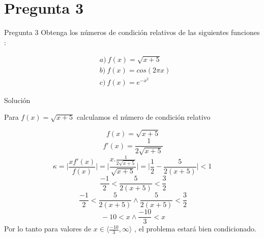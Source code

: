 \documentclass[10pts]{beamer}
\begin{document}
\vspace*{\fill}
\newpage



\section{Pregunta 3}
\begin{frame}{Pregunta 3}
     Obtenga los números de condición relativos de las siguientes funciones :

        \begin{equation}
        \begin{split}
	    &a) \ f(x)=\sqrt{x+5} \\
	    &b) \ f(x)=cos(2{\pi}x) \\
	    &c) \ f(x)=e^{-x^2} 
	    \end{split}
        \end{equation}
        
\end{frame}

\begin{frame}{Solución}

\vspace*{\fill}
Para $f(x) = \sqrt{x+5}$ calculamos el número de condición relativo 

    \[ \ f(x)=\sqrt{x+5}\]
    \[ \ f'(x)= \frac{1}{2\sqrt{x+5}} \]
    \[\kappa = \bigg | \frac{x f'(x)}{f(x)} \bigg|  = \bigg | \frac{x.\frac{1}{2\sqrt{x+5}}}{\sqrt{x+5}} \bigg| = \bigg|\frac{1}{2}-\frac{5}{2(x+5)}\bigg| < 1\]
    \[ \ \frac{-1}{2}<\frac{5}{2(x+5)}<\frac{3}{2}\]
    \[ \ \frac{-1}{2}<\frac{5}{2(x+5)} \land \frac{5}{2(x+5)}<\frac{3}{2}\]
    \[ \ -10<x \land \frac{-10}{3}<x\]
    Por lo tanto para valores de  $x \in \langle \frac{-10}{3},\infty\rangle$ , el problema estará bien condicionado.
\vspace*{\fill}
\end{frame}
\end{document}

